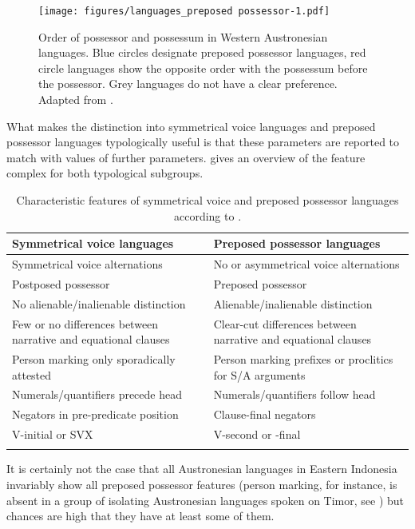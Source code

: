 \begin{figure}
\texttt{[image: figures/languages\_preposed possessor-1.pdf]}
\caption[Order of possessor and possessum in Western Austronesian languages]{Order of possessor and possessum in Western Austronesian languages. Blue circles designate preposed possessor languages, red circle languages show the opposite order with the possessum before the possessor. Grey languages do not have a clear preference. Adapted from \citet{wals-86}.}\label{figure:preposed}
\end{figure}

What makes the distinction into symmetrical voice languages and preposed possessor languages typologically useful is that these parameters are reported to match with values of further parameters.  gives an overview of the feature complex for both typological subgroups. 

\begin{table}[ht]
	\small
\begin{tabularx}{\textwidth}{QQ}
\lsptoprule
Symmetrical voice languages & Preposed possessor languages \tabularnewline
\midrule
Symmetrical voice alternations & No or asymmetrical voice alternations \tabularnewline
\tablevspace
Postposed possessor & Preposed possessor \tabularnewline
\tablevspace
No alienable/inalienable distinction & Alienable/inalienable distinction \tabularnewline
\tablevspace
Few or no differences between narrative and equational clauses & Clear-cut differences between narrative and equational clauses \tabularnewline
\tablevspace
Person marking only sporadically attested & Person marking prefixes or proclitics for S/A arguments \tabularnewline
\tablevspace
Numerals/quantifiers precede head & Numerals/quantifiers follow head \tabularnewline
\tablevspace
Negators in pre-predicate position & Clause-final negators \tabularnewline
\tablevspace
V-initial or SVX & V-second or -final \tabularnewline
\lspbottomrule
\end{tabularx}
\caption[Characteristic features of symmetrical voice and preposed possessor languages]{Characteristic features of symmetrical voice and preposed possessor languages according to \citet[175]{Himmelmann2005austronesian}.}
\label{table:sympre}
\end{table}

It is certainly not the case that all Austronesian languages in Eastern Indonesia invariably show all preposed possessor features (person marking, for instance, is absent in a group of isolating Austronesian languages spoken on Timor, see \citealt[175]{Himmelmann2005austronesian}) but chances are high that they have at least some of them. 

